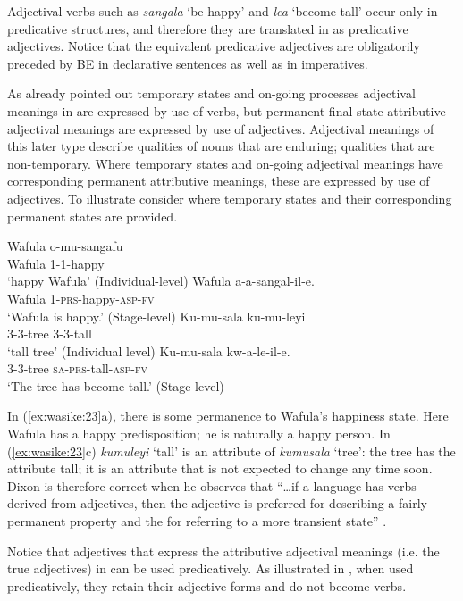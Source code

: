 \documentclass[output=paper,
modfonts
]{langscibook}
\begin{document}
Adjectival verbs such as \textit{sangala} ‘be happy’ and \textit{lea} ‘become tall’ occur only in predicative structures, and therefore they are translated in  as predicative adjectives. Notice that the equivalent  predicative adjectives are obligatorily preceded by BE in declarative sentences as well as in imperatives. 

As already pointed out temporary states and on-going processes adjectival meanings in  are expressed by use of verbs, but permanent final-state attributive adjectival meanings are expressed by use of adjectives. Adjectival meanings of this later type describe qualities of nouns that are enduring; qualities that are non-temporary. Where temporary states and on-going adjectival meanings have corresponding permanent attributive meanings, these are expressed by use of adjectives. To illustrate consider  where temporary states and their corresponding permanent states are provided.

\ea\label{ex:wasike:23}
\ea
\gll Wafula o-mu-sangafu\\
     Wafula 1-1-happy\\
\glt ‘happy Wafula’ (Individual-level)
\ex
\gll  Wafula a-a-sangal-il-e.\\
     Wafula 1-\textsc{prs}-happy-\textsc{asp}-\textsc{fv}\\
\glt ‘Wafula is happy.’ (Stage-level)
\ex
\gll  Ku-mu-sala ku-mu-leyi\\
     3-3-tree 3-3-tall\\
\glt ‘tall tree’ (Individual level)
\ex
\gll  Ku-mu-sala kw-a-le-il-e.\\
     3-3-tree \textsc{sa}-\textsc{prs}-tall-\textsc{asp}-\textsc{fv}\\
\glt ‘The tree has become tall.’ (Stage-level)
\z
\z

In (\ref{ex:wasike:23}a), there is some permanence to Wafula’s happiness state. Here Wafula has a happy predisposition; he is naturally a happy person. In (\ref{ex:wasike:23}c) \textit{kumuleyi} ‘tall’ is an attribute of \textit{kumusala} ‘tree’: the tree has the attribute tall; it is an attribute that is not expected to change any time soon. Dixon is therefore correct when he observes that “…if a language has verbs derived from adjectives, then the adjective is preferred for describing a fairly permanent property and the  for referring to a more transient state” \citep[32]{Dixon2004}.

Notice that adjectives that express the attributive adjectival meanings (i.e. the true adjectives) in  can be used predicatively. As illustrated in , when used predicatively, they retain their adjective forms and do not become verbs.
\end{document}

